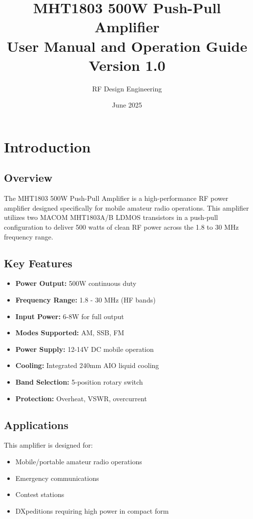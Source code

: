\documentclass[11pt,a4paper]{article}
\title{\Huge\textbf{MHT1803 500W Push-Pull Amplifier}\\
\Large User Manual and Operation Guide\\
\large Version 1.0}
\author{RF Design Engineering}
\date{June 2025}
\begin{document}
\maketitle
\thispagestyle{empty}

\newpage
\tableofcontents
\newpage

\section{Introduction}

\subsection{Overview}
The MHT1803 500W Push-Pull Amplifier is a high-performance RF power amplifier designed specifically for mobile amateur radio operations. This amplifier utilizes two MACOM MHT1803A/B LDMOS transistors in a push-pull configuration to deliver 500 watts of clean RF power across the 1.8 to 30 MHz frequency range.

\subsection{Key Features}
\begin{itemize}
    \item \textbf{Power Output:} 500W continuous duty
    \item \textbf{Frequency Range:} 1.8 - 30 MHz (HF bands)
    \item \textbf{Input Power:} 6-8W for full output
    \item \textbf{Modes Supported:} AM, SSB, FM
    \item \textbf{Power Supply:} 12-14V DC mobile operation
    \item \textbf{Cooling:} Integrated 240mm AIO liquid cooling
    \item \textbf{Band Selection:} 5-position rotary switch
    \item \textbf{Protection:} Overheat, VSWR, overcurrent
\end{itemize}

\subsection{Applications}
This amplifier is designed for:
\begin{itemize}
    \item Mobile/portable amateur radio operations
    \item Emergency communications
    \item Contest stations
    \item DXpeditions requiring high power in compact form
\end{itemize}
\end{document}
